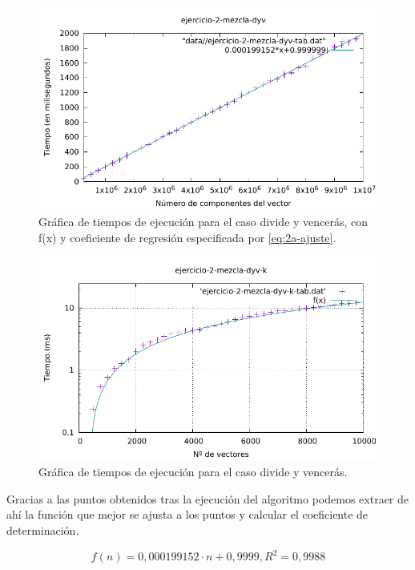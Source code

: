 \begin{figure}[h]
    \centering
    \includegraphics[scale=0.76]{img/e2-dyv-n.pdf}
    \caption{Gráfica de tiempos de ejecución para el caso divide y vencerás, 
    con f(x) y coeficiente de regresión especificada por \ref{eq:2a-ajuste}.}
\end{figure}


\begin{figure}[h]
    \centering
    \includegraphics[scale=0.76]{img/e2-dyv-k.pdf}
    \caption{Gráfica de tiempos de ejecución para el caso divide y vencerás.}
\end{figure}

Gracias a las puntos obtenidos tras la ejecución del algoritmo podemos extraer de ahí 
la función que mejor se ajusta a los puntos y calcular el coeficiente de determinación.

\begin{equation}
    \boxed{f(n) = 0,000199152 \cdot n + 0,9999, R^2 = 0,9988}
    \label{eq:2b-ajuste-n}
\end{equation}

